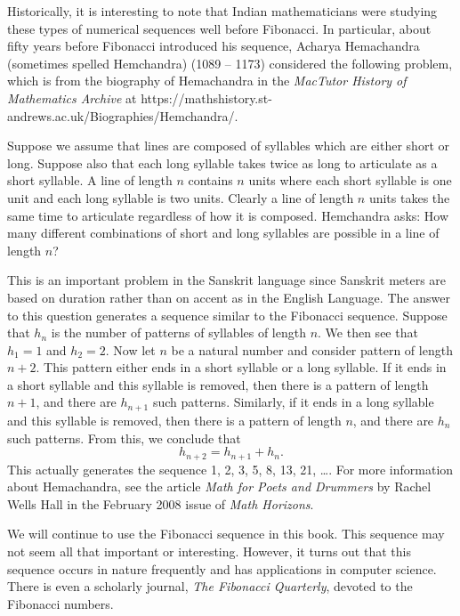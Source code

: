 Historically, it is interesting to note that Indian mathematicians were studying these types of numerical sequences well before Fibonacci.  In particular, about fifty years before Fibonacci introduced his sequence, Acharya Hemachandra (sometimes spelled Hemchandra)
%
 (1089 -- 1173) considered the following problem, which is from the biography of Hemachandra in the 
\emph{MacTutor History of Mathematics Archive} at {https://mathshistory.st-andrews.ac.uk/Biographies/Hemchandra/}.
\begin{list}{}
\item  Suppose we assume that lines are composed of syllables which are either short or long. Suppose also that each long syllable takes twice as long to articulate as a short syllable. A line of length $n$ contains $n$ units where each short syllable is one unit and each long syllable is two units. Clearly a line of length $n$ units takes the same time to articulate regardless of how it is composed. Hemchandra asks: How many different combinations of short and long syllables are possible in a line of length $n$? 
\end{list}
This is an important problem in the Sanskrit language since Sanskrit meters are based on duration rather than on accent as in the English Language.  The answer to this question generates a sequence similar to the Fibonacci sequence.  Suppose that $h_n$ is the number of patterns of syllables of length $n$.  We then see that  $h_1 = 1$ and $h_2 = 2$.  Now let $n$ be a natural number and consider pattern of length $n + 2$.  This pattern either ends in a short syllable or a long syllable.  If it ends in a short syllable and this syllable is removed, then there is a pattern of length $n+1$, and there are $h_{n+1}$ such patterns.  Similarly, if it ends in a long syllable and this syllable is removed, then there is a pattern of length $n$, and there are $h_n$ such patterns.  From this, we conclude that
\[
h_{n+2} = h_{n+1} + h_n.
\]
This actually generates the sequence 1, 2, 3, 5, 8, 13, 21, \ldots.
%
For more information about Hemachandra, see the article \emph{Math for Poets and Drummers} by Rachel Wells Hall in the February 2008 issue of \emph{Math Horizons}.

We will continue to use the Fibonacci sequence in this book.  This sequence may not seem all that important or interesting.  However, it turns out that this sequence occurs in nature frequently and has applications in computer science.  There is even a scholarly journal, \textit{The Fibonacci Quarterly},
%
 devoted to the Fibonacci numbers.

